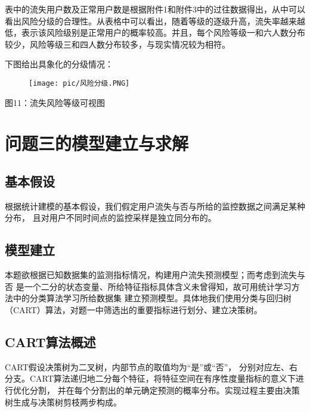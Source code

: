 \documentclass{ctexart}
\begin{document}
        表中的流失用户数及正常用户数是根据附件1和附件3中的过往数据得出，从中可以看出风险分级的合理性。从表格中可以看出，随着等级的逐级升高，流失率越来越低，表示该风险级别是正常用户的概率较高。并且，每个风险等级一和六人数分布较少，风险等级三和四人数分布较多，与现实情况较为相符。

        下图给出具象化的分级情况：

        \begin{center}
            \begin{figure}[H]
                \begin{center}
                    \texttt{[image: pic/风险分级.PNG]}
                \end{center}
            \end{figure}
            图11：流失风险等级可视图
        \end{center}

        \section{问题三的模型建立与求解}
    \subsection{基本假设}
    根据统计建模的基本假设，我们假定用户流失与否与所给的监控数据之间满足某种分布，
    且对用户不同时间点的监控采样是独立同分布的。
    \subsection{模型建立}
    本题欲根据已知数据集的监测指标情况，构建用户流失预测模型；而考虑到流失与否
    是一个二分的状态变量、所给特征指标具体含义未曾得知，故可用统计学习方法中的分类算法学习所给数据集
    建立预测模型。具体地我们使用分类与回归树（CART）算法，对题一中筛选出的重要指标进行划分、建立决策树。
    \subsection{CART算法概述}
    CART假设决策树为二叉树，内部节点的取值均为“是”或“否”，
    分别对应左、右分支。CART算法递归地二分每个特征，将特征空间在有序性度量指标的意义下进行优化分割，
    并在每个分割出的单元确定预测的概率分布。实现过程主要由决策树生成与决策树剪枝两步构成。
\end{document}
